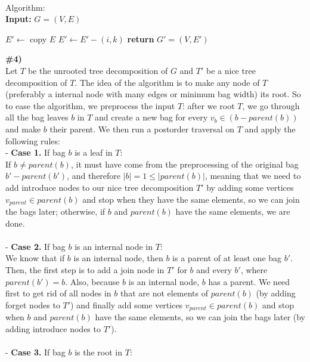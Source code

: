 \documentclass{article}
\newcommand\tab[1][1cm]{\hspace*{#1}}
\begin{document}
\\
Algorithm:\\
\textbf{Input:} $G=(V,E)$
\begin{algorithmic}
\State $E' \gets$ copy $E$
        \State $E' \gets E' - (i, k)$
      \EndIf
    \EndFor
  \EndFor
\EndFor
\State \textbf{return} $G'=(V, E')$
\\
\end{algorithmic} 
\textbf{\#4)}
\\
Let $T$ be the unrooted tree decomposition of $G$ and $T'$ be a nice tree decomposition of $T$. The idea of the algorithm is to make any node of $T$ (preferably a internal node with many edges or minimum bag width) its root. So to ease the algorithm, we  preprocess the input $T$: after we root $T$, we go through all the bag leaves $b$ in $T$ and create a new bag for every $v_b \in (b - parent(b))$ and make $b$ their parent. We then run a postorder traversal on $T$ and apply the following rules:
\\
- \textbf{Case 1.} If bag $b$ is a leaf in $T$:
\\
\tab If $b \neq parent(b)$, it must have come from the preprocessing of the original bag $b' - parent(b')$, and therefore $|b| = 1 \leq |parent(b)|$, meaning that we need to add introduce nodes to our nice tree decomposition $T'$ by adding some vertices $v_{parent} \in parent(b)$ and stop when they have the same elements, so we can join the bags later; otherwise, if $b$ and $parent(b)$ have the same elements, we are done.
\\
\\
- \textbf{Case 2.} If bag $b$ is an internal node in $T$:
\\
\tab We know that if $b$ is an internal node, then $b$ is a parent of at least one bag $b'$.  Then, the first step is to add a join node in $T'$ for $b$ and every $b'$, where $parent(b') = b$. Also, because $b$ is an internal node, $b$ has a parent. We need first to get rid of all nodes in $b$ that are not elements of $parent(b)$ (by adding forget nodes to $T'$) and finally add some vertices  $v_{parent} \in parent(b)$ and stop when $b$ and $parent(b)$ have the same elements, so we can join the bags later (by adding introduce nodes to $T'$).
\\
\\
- \textbf{Case 3.} If bag $b$ is the root in $T$:
\end{document}
